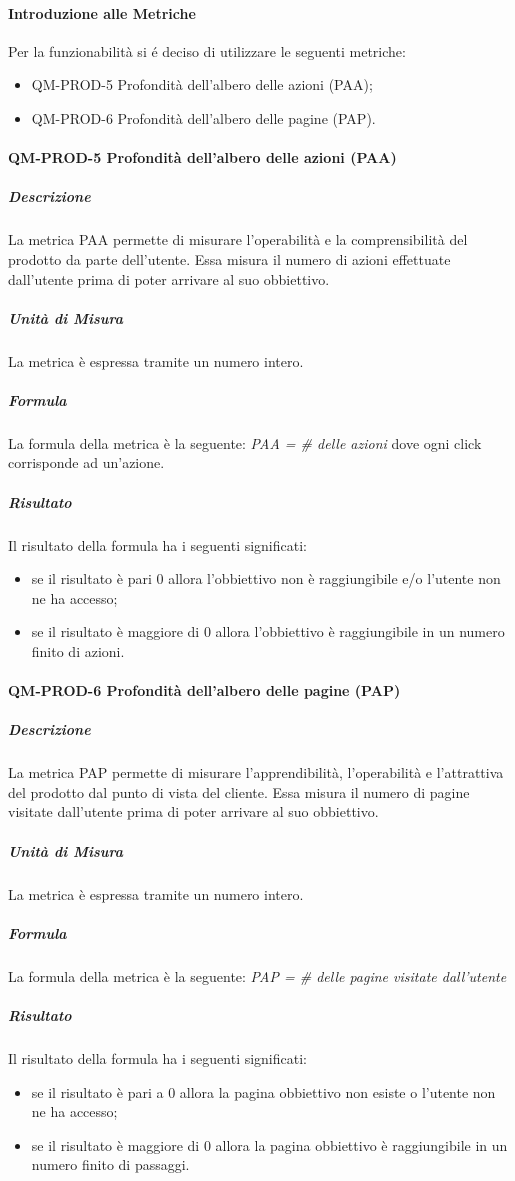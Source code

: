 			\paragraph{Introduzione alle Metriche}
				Per la funzionabilità si é deciso di utilizzare le seguenti metriche:
				\begin{itemize}
					\item QM-PROD-5 Profondità dell'albero delle azioni (PAA);
					\item QM-PROD-6 Profondità dell'albero delle pagine (PAP).
				\end{itemize}
			\paragraph{QM-PROD-5 Profondità dell'albero delle azioni (PAA)}
				\subparagraph{Descrizione}
					La metrica PAA permette di misurare l'operabilità e la comprensibilità del prodotto da parte dell'utente. Essa misura il numero di azioni effettuate dall'utente prima di poter arrivare al suo obbiettivo.
				\subparagraph{Unità di Misura}
					La metrica è espressa tramite un numero intero.
				\subparagraph{Formula}
					La formula della metrica è la seguente:
					\textit{PAA = \# delle azioni}
					dove ogni click corrisponde ad un'azione.
				\subparagraph{Risultato}
					Il risultato della formula ha i seguenti significati:
					\begin{itemize}
						\item se il risultato è pari 0 allora l'obbiettivo non è raggiungibile e/o l'utente non ne ha accesso;
						\item se il risultato è maggiore di 0 allora l'obbiettivo è raggiungibile in un numero finito di azioni.
					\end{itemize}
			\paragraph{QM-PROD-6 Profondità dell'albero delle pagine (PAP)}
				\subparagraph{Descrizione}
					La metrica PAP permette di misurare l'apprendibilità, l'operabilità e l'attrattiva del prodotto dal punto di vista del cliente. Essa misura il numero di pagine visitate dall'utente prima di poter arrivare al suo obbiettivo.
				\subparagraph{Unità di Misura}
					La metrica è espressa tramite un numero intero.
				\subparagraph{Formula}
					La formula della metrica è la seguente:
					\textit{PAP = \# delle pagine visitate dall'utente}
				\subparagraph{Risultato}
					Il risultato della formula ha i seguenti significati:
					\begin{itemize}
						\item se il risultato è pari a 0 allora la pagina obbiettivo non esiste o l'utente non ne ha accesso;
						\item se il risultato è maggiore di 0 allora la pagina obbiettivo è raggiungibile in un numero finito di passaggi.
					\end{itemize}

